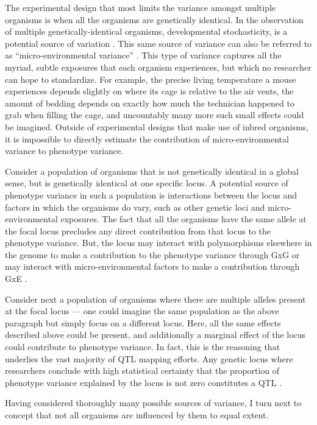 The experimental design that most limits the variance amongst multiple organisms is when all the organisms are genetically identical.
In the observation of multiple genetically-identical organisms, developmental stochasticity, is a potential source of variation \citep{Fraser2010}.
This same source of variance can also be referred to as ``micro-environmental variance'' \citep{Hill2010}.
This type of variance captures all the myriad, subtle exposures that each organism experiences, but which no researcher can hope to standardize.
For example, the precise living temperature a mouse experiences depends slightly on where its cage is relative to the air vents, the amount of bedding depends on exactly how much the technician happened to grab when filling the cage, and uncountably many more such small effects could be imagined.
Outside of experimental designs that make use of inbred organisms, it is impossible to directly estimate the contribution of micro-environmental variance to phenotype variance.

Consider a population of organisms that is not genetically identical in a global sense, but is genetically identical at one specific locus.
A potential source of phenotype variance in such a population is interactions between the locus and factors in which the organisms do vary, such as other genetic loci and micro-environmental exposures.
The fact that all the organisms have the same allele at the focal locus precludes any direct contribution from that locus to the phenotype variance.
But, the locus may interact with polymorphisms elsewhere in the genome to make a contribution to the phenotype variance through GxG or may interact with micro-environmental factors to make a contribution through GxE \citep{Falconer1995-od,Struchalin2010,Ronnegard2011a}.

Consider next a population of organisms where there are multiple alleles present at the focal locus --- one could imagine the same population as the above paragraph but simply focus on a different locus.
Here, all the same effects described above could be present, and additionally a marginal effect of the locus could contribute to phenotype variance.
In fact, this is the reasoning that underlies the vast majority of QTL mapping efforts.
Any genetic locus where researchers conclude with high statistical certainty that the proportion of phenotype variance explained by the locus is not zero constitutes a QTL \citep{Broman2009,Broman2010}.

Having considered thoroughly many possible sources of variance, I turn next to concept that not all organisms are influenced by them to equal extent.

